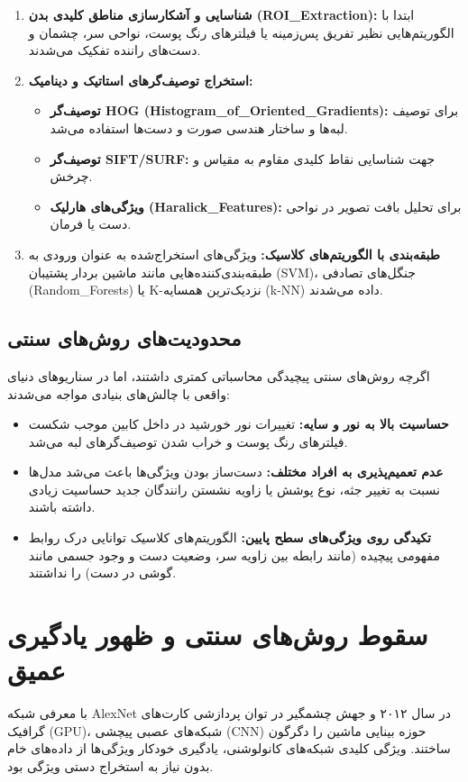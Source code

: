 \documentclass{report}
\begin{document}
 	\begin{enumerate}
 		\item \textbf{شناسایی و آشکارسازی مناطق کلیدی بدن (ROI\_Extraction):} ابتدا با الگوریتم‌هایی نظیر تفریق پس‌زمینه یا فیلترهای رنگ پوست، نواحی سر، چشمان و دست‌های راننده تفکیک می‌شدند.
 		\item \textbf{استخراج توصیف‌گرهای استاتیک و دینامیک:}
 		\begin{itemize}
 			\item \textbf{توصیف‌گر HOG (Histogram\_of\_Oriented\_Gradients):} برای توصیف لبه‌ها و ساختار هندسی صورت و دست‌ها استفاده می‌شد.
 			\item \textbf{توصیف‌گر SIFT/SURF:} جهت شناسایی نقاط کلیدی مقاوم به مقیاس و چرخش.
 			\item \textbf{ویژگی‌های هارلیک (Haralick\_Features):} برای تحلیل بافت تصویر در نواحی دست یا فرمان.
 		\end{itemize}
 		\item \textbf{طبقه‌بندی با الگوریتم‌های کلاسیک:} ویژگی‌های استخراج‌شده به عنوان ورودی به طبقه‌بندی‌کننده‌هایی مانند ماشین بردار پشتیبان (SVM)، جنگل‌های تصادفی (Random\_Forests) یا K-نزدیک‌ترین همسایه (k-NN) داده می‌شدند.
 	\end{enumerate}
 	
 	\subsection{محدودیت‌های روش‌های سنتی}
 	اگرچه روش‌های سنتی پیچیدگی محاسباتی کمتری داشتند، اما در سناریوهای دنیای واقعی با چالش‌های بنیادی مواجه می‌شدند:
 	\begin{itemize}
 		\item \textbf{حساسیت بالا به نور و سایه:} تغییرات نور خورشید در داخل کابین موجب شکست فیلترهای رنگ پوست و خراب شدن توصیف‌گرهای لبه می‌شد.
 		\item \textbf{عدم تعمیم‌پذیری به افراد مختلف:} دست‌ساز بودن ویژگی‌ها باعث می‌شد مدل‌ها نسبت به تغییر جثه، نوع پوشش یا زاویه نشستن رانندگان جدید حساسیت زیادی داشته باشند.
 		\item \textbf{تکیدگی روی ویژگی‌های سطح پایین:} الگوریتم‌های کلاسیک توانایی درک روابط مفهومی پیچیده (مانند رابطه بین زاویه سر، وضعیت دست و وجود جسمی مانند گوشی در دست) را نداشتند.
 	\end{itemize}
 	
 	\section{سقوط روش‌های سنتی و ظهور یادگیری عمیق}
 	با معرفی شبکه AlexNet در سال ۲۰۱۲ و جهش چشمگیر در توان پردازشی کارت‌های گرافیک (GPU)، شبکه‌های عصبی پیچشی (CNN) حوزه بینایی ماشین را دگرگون ساختند. ویژگی کلیدی شبکه‌های کانولوشنی، یادگیری خودکار ویژگی‌ها از داده‌های خام بدون نیاز به استخراج دستی ویژگی بود.
 	
\end{document}
